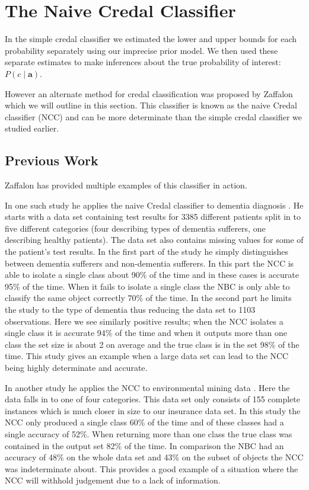 \chapter{The Naive Credal Classifier}

In the simple credal classifier we estimated the lower and upper bounds for each probability separately using our imprecise prior model.
We then used these separate estimates to make inferences about the true probability of interest: $P(c \mid \mathbf{a})$.

However an alternate method for credal classification was proposed by Zaffalon \cite{Zaffalon01} which we will outline in this section.
This classifier is known as the naive Credal classifier (NCC) and can be more determinate than the simple credal classifier we studied earlier.

\section{Previous Work}

Zaffalon has provided multiple examples of this classifier in action.

In one such study he applies the naive Credal classifier to dementia diagnosis \cite{Zaffalon03}.
He starts with a data set containing test results for 3385 different patients split in to five different categories (four describing types of dementia sufferers, one describing healthy patients).
The data set also contains missing values for some of the patient's test results.
In the first part of the study he simply distinguishes between dementia sufferers and non-dementia sufferers.
In this part the NCC is able to isolate a single class about 90\% of the time and in these cases is accurate 95\% of the time.
When it fails to isolate a single class the NBC is only able to classify the same object correctly 70\% of the time.
In the second part he limits the study to the type of dementia thus reducing the data set to 1103 observations.
Here we see similarly positive results; when the NCC isolates a single class it is accurate 94\% of the time and when it outputs more than one class the set size is about 2 on average and the true class is in the set 98\% of the time.
This study gives an example when a large data set can lead to the NCC being highly determinate and accurate.

In another study he applies the NCC to environmental mining data \cite{Zaffalon02}.
Here the data falls in to one of four categories.
This data set only consists of 155 complete instances which is much closer in size to our insurance data set.
In this study the NCC only produced a single class 60\% of the time and of these classes had a single accuracy of 52\%.
When returning more than one class the true class was contained in the output set 82\% of the time.
In comparison the NBC had an accuracy of 48\% on the whole data set and 43\% on the subset of objects the NCC was indeterminate about.
This provides a good example of a situation where the NCC will withhold judgement due to a lack of information.


